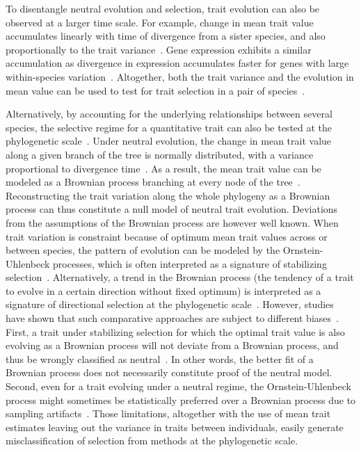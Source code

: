 \documentclass{article}
\begin{document}
To disentangle neutral evolution and selection, trait evolution can also be observed at a larger time scale.
For example, change in mean trait value accumulates linearly with time of divergence from a sister species, and also proportionally to the trait variance~\parencite{lande_genetic_1980, turelli_heritable_1984}. %
Gene expression exhibits a similar accumulation as divergence in expression accumulates faster for genes with large within-species variation~\parencite{khaitovich_neutral_2004}.
Altogether, both the trait variance and the evolution in mean value can be used to test for trait selection in a pair of species~\parencite{walsh_evolution_2018}.

Alternatively, by accounting for the underlying relationships between several species, the selective regime for a quantitative trait can also be tested at the phylogenetic scale~\parencite{felsenstein_phylogenies_1985}.
Under neutral evolution, the change in mean trait value along a given branch of the tree is normally distributed, with a variance proportional to divergence time~\parencite{hansen_translating_1996}.
As a result, the mean trait value can be modeled as a Brownian process branching at every node of the tree~\parencite{hansen_translating_1996, harmon_phylogenetic_2018}.
Reconstructing the trait variation along the whole phylogeny as a Brownian process can thus constitute a null model of neutral trait evolution.
Deviations from the assumptions of the Brownian process are however well known.
When trait variation is constraint because of optimum mean trait values across or between species, the pattern of evolution can be modeled by the Ornstein-Uhlenbeck processes, which is often interpreted as a signature of stabilizing selection~\parencite{catalan_drift_2019}.
Alternatively, a trend in the Brownian process (the tendency of a trait to evolve in a certain direction without fixed optimum) is interpreted as a signature of directional selection at the phylogenetic scale~\parencite{silvestro_early_2019}.
However, studies have shown that such comparative approaches are subject to different biases~\parencite{harmon_phylogenetic_2018}.
First, a trait under stabilizing selection for which the optimal trait value is also evolving as a Brownian process will not deviate from a Brownian process, and thus be wrongly classified as neutral~\parencite{hansen_translating_1996}.
In other words, the better fit of a Brownian process does not necessarily constitute proof of the neutral model.
Second, even for a trait evolving under a neutral regime, the Ornstein-Uhlenbeck process might sometimes be statistically preferred over a Brownian process due to sampling artifacts~\parencite{silvestro_measurement_2015, cooper_cautionary_2016, price_detecting_2022}.
Those limitations, altogether with the use of mean trait estimates leaving out the variance in traits between individuals, easily generate misclassification of selection from methods at the phylogenetic scale.
\end{document}
